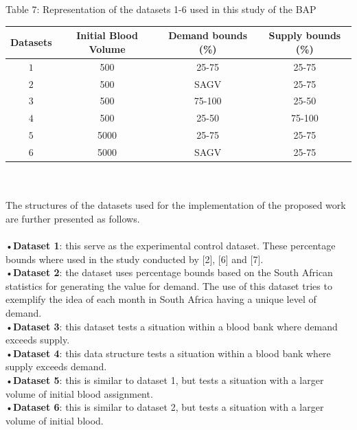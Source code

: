 \documentclass{article}
\begin{document}
\\
\\
\begin {center}
Table 7: {Representation of the datasets 1-6 used in this study of the BAP}

\end {center}
\begin{center}
\begin {tabular}{|c|c|c|c|}
\hline

Datasets& Initial Blood Volume&Demand bounds (\%)&Supply bounds (\%) \\ [0.5ex]
\hline

 $1$&500&25-75&25-75\\
  $2$&500&SAGV&25-75\\
   $3$&500&75-100&25-50\\
    $4$&500&25-50&75-100\\
     $5$&5000&25-75&25-75\\
      $6$&5000&SAGV&25-75\\
\hline

\end {tabular}

\end {center}
\\
\\
The structures of the datasets used for the implementation of the proposed work are further presented as follows. 
\\
\\
•\textbf{Dataset 1}: this serve as the experimental control dataset. These percentage bounds where used in the study conducted by [2], [6] and [7]. \\
•\textbf{Dataset 2}: the dataset uses percentage bounds based on the South African statistics for generating the value for demand. The use of this dataset tries to exemplify the idea of each month in South Africa having a unique level of demand.\\
•\textbf{Dataset 3}: this dataset tests a situation within a blood bank where demand exceeds supply. \\
•\textbf{Dataset 4}: this data structure tests a situation within a blood bank where supply exceeds demand.\\
•\textbf{Dataset 5}: this is similar to dataset 1, but tests a situation with a larger volume of initial blood assignment.\\
•\textbf{Dataset 6}: this is similar to dataset 2, but tests a situation with a larger volume of initial blood.\\
\end{document}
